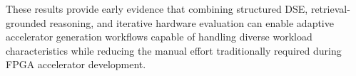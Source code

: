 
These results provide early evidence that combining structured DSE, retrieval-grounded reasoning, and iterative hardware evaluation can enable adaptive accelerator generation workflows capable of handling diverse workload characteristics while reducing the manual effort traditionally required during FPGA accelerator development.